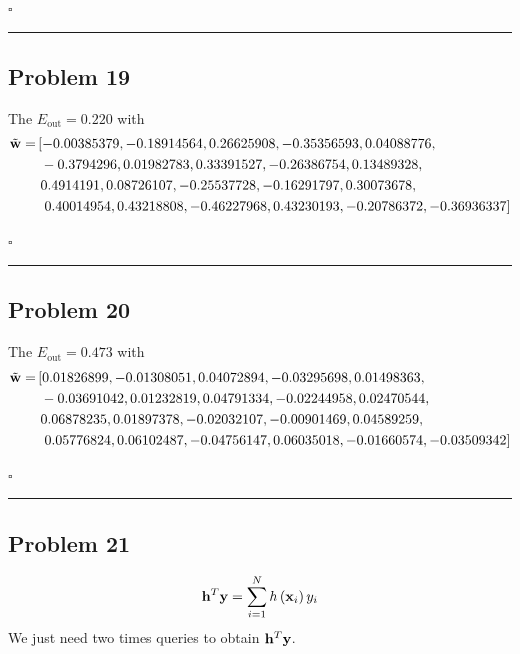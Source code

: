 \documentclass[12pt]{article}
\newcommand*{\QEDB}{\hfill\ensuremath{\square}}
\newcommand{\ParTh}[1]{\left(#1\right)}
\newcommand{\BF}[1]{{\bf#1}}
\newcommand{\horrule}[1]{\rule{\linewidth}{#1}}
\begin{document}
\QEDB

\horrule{0.5pt}

\subsection*{Problem 19}

The $E_{\text{out}}=0.220$ with
\begin{align}
\tilde{\BF{w}}=&\left[-0.00385379, -0.18914564,  0.26625908, -0.35356593,  0.04088776,\right.\\
\nonumber
&~-0.3794296,
0.01982783,  0.33391527, -0.26386754,  0.13489328,\\
\nonumber
&~0.4914191,   0.08726107,
-0.25537728, -0.16291797,  0.30073678,\\
\nonumber
&~\left.0.40014954,  0.43218808, -0.46227968,
0.43230193, -0.20786372, -0.36936337\right]
\end{align}

\QEDB

\horrule{0.5pt}

\subsection*{Problem 20}

The $E_{\text{out}}=0.473$ with
\begin{align}
\tilde{\BF{w}}=&\left[0.01826899, -0.01308051,  0.04072894, -0.03295698,  0.01498363,\right.\\
\nonumber
&~-0.03691042,0.01232819,  0.04791334, -0.02244958,  0.02470544,\\
\nonumber
&~0.06878235,  0.01897378,-0.02032107, -0.00901469,  0.04589259,\\
\nonumber
&~\left.0.05776824,  0.06102487, -0.04756147,0.06035018, -0.01660574, -0.03509342\right]
\end{align}

\QEDB

\horrule{0.5pt}

\subsection*{Problem 21}

\begin{align}
\BF{h}^T\BF{y}=\sum_{i=1}^{N}h\ParTh{\BF{x}_i}y_i
\end{align}
We just need two times queries to obtain $\BF{h}^T\BF{y}$.
\end{document}
